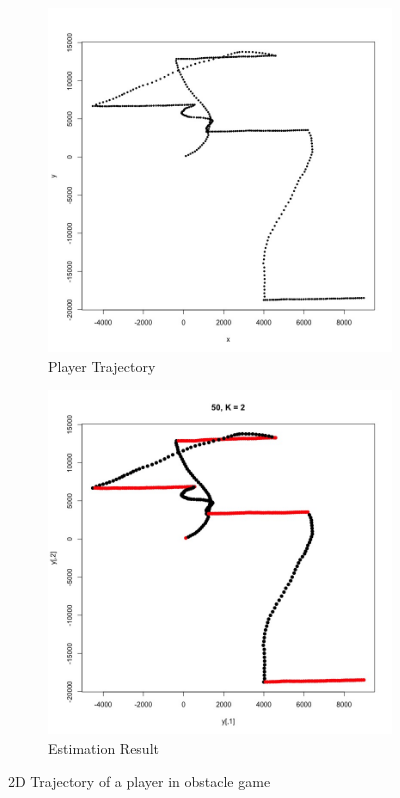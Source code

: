 \documentclass{article} %
\begin{document}
\begin{figure}[!h]
\centering
\begin{subfigure}[b]{0.45\textwidth}
\includegraphics[width = \linewidth]{"./plot/slds/trajectory"}
\caption{Player Trajectory}
\end{subfigure}
\begin{subfigure}[b]{0.45\textwidth}
\includegraphics[width = \linewidth]{"./plot/slds/result"}
\caption{Estimation Result}
\end{subfigure}
\caption{2D Trajectory of a player in obstacle game}
\label{fig:trajectory}
\end{figure}
\end{document}
